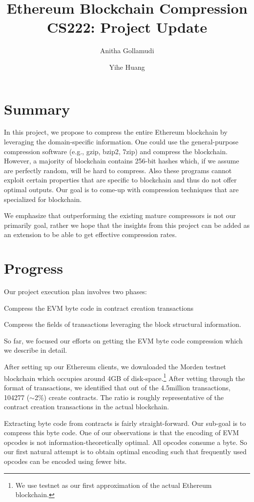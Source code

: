 \documentclass[12pt]{article}
\title{Ethereum Blockchain Compression\\
	\large CS222: Project Update
	}
\author{Anitha Gollamudi 
	\and
	Yihe Huang}
\newcommand\peth{Ethereum\xspace}
\begin{document}
%

\maketitle

\section{Summary}
In this project, we propose to compress the entire \peth blockchain by leveraging the domain-specific information.
One could use the general-purpose compression software (e.g., gzip, bzip2, 7zip) and compress the blockchain.
However, a majority of blockchain contains 256-bit hashes which, if we assume are perfectly random, will be hard to compress.
Also these programs cannot exploit certain properties that are specific to blockchain and thus do not offer optimal outputs.
Our goal is to come-up with compression techniques that  are specialized for blockchain.

We emphasize that outperforming the existing mature compressors is not our primarily goal, rather
we hope that the insights from this project can be added as an extension to be able to get effective compression rates.   

\section{Progress}
Our project execution plan involves two phases: 
\begin{enumerate*}[label=(\roman*)]
	\item Compress the EVM byte code in contract creation transactions 
	\item Compress the fields of transactions leveraging the block structural information.
\end{enumerate*}
So far, we focused our efforts on getting the EVM byte code compression which we describe in detail.

After setting up our Ethereum clients, we downloaded the Morden testnet blockchain which occupies around 4GB of disk-space.\footnote{We use testnet as our first approximation of the actual \peth blockchain.}
After vetting through the format of transactions, we identified that out of the 4.5million transactions,  104277 ($\sim$2\%) create contracts.
The ratio is roughly representative of the contract creation transactions in the actual blockchain.

Extracting byte code from contracts is fairly straight-forward. Our sub-goal is to compress this byte code.
One of our observations is that the encoding of EVM opcodes is not information-theoretically optimal. All opcodes consume a byte.
So our first natural attempt is to obtain optimal encoding such that frequently used opcodes can be encoded using fewer bits.
\end{document}
